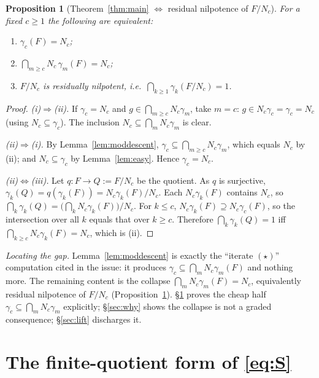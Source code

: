 \documentclass{amsart}
\newtheorem{proposition}{Proposition}
\theoremstyle{definition}
\theoremstyle{remark}
\begin{document}
\begin{proposition}[Theorem~\ref{thm:main} $\Leftrightarrow$ residual nilpotence of $F/N_c$]
\label{prop:equivresnilp}
For a fixed $c\ge1$ the following are equivalent:
\begin{enumerate}
\item[\textup{(i)}] $\gamma_c(F)=N_c$;
\item[\textup{(ii)}] $\bigcap_{m\ge c}N_c\,\gamma_m(F)=N_c$;
\item[\textup{(iii)}] $F/N_c$ is residually nilpotent, i.e.\ $\bigcap_{k\ge1}\gamma_k(F/N_c)=1$.
\end{enumerate}
\end{proposition}
\begin{proof}
\emph{(i)$\Rightarrow$(ii).} If $\gamma_c=N_c$ and $g\in\bigcap_{m\ge c}N_c\gamma_m$,
take $m=c$: $g\in N_c\gamma_c=\gamma_c=N_c$ (using $N_c\subseteq\gamma_c$). The
inclusion $N_c\subseteq\bigcap_m N_c\gamma_m$ is clear.

\emph{(ii)$\Rightarrow$(i).} By Lemma~\ref{lem:moddescent}, $\gamma_c\subseteq
\bigcap_{m\ge c}N_c\gamma_m$, which equals $N_c$ by (ii); and $N_c\subseteq\gamma_c$
by Lemma~\ref{lem:easy}. Hence $\gamma_c=N_c$.

\emph{(ii)$\Leftrightarrow$(iii).} Let $q\colon F\to Q:=F/N_c$ be the quotient. As
$q$ is surjective, $\gamma_k(Q)=q(\gamma_k(F))=N_c\gamma_k(F)/N_c$. Each
$N_c\gamma_k(F)$ contains $N_c$, so
$\bigcap_k\gamma_k(Q)=\big(\bigcap_k N_c\gamma_k(F)\big)/N_c$. For $k\le c$,
$N_c\gamma_k(F)\supseteq N_c\gamma_c(F)$, so the intersection over all $k$ equals that
over $k\ge c$. Therefore $\bigcap_k\gamma_k(Q)=1$ iff $\bigcap_{k\ge c}N_c\gamma_k(F)
=N_c$, which is (ii).
\end{proof}

\noindent\emph{Locating the gap.} Lemma~\ref{lem:moddescent} is exactly the
``iterate $(\star)$'' computation cited in the issue: it produces
$\gamma_c\subseteq\bigcap_m N_c\gamma_m(F)$ and nothing more. The remaining content
is the collapse $\bigcap_m N_c\gamma_m(F)=N_c$, equivalently residual nilpotence of
$F/N_c$ (Proposition~\ref{prop:equivresnilp}). \S\ref{sec:finite} proves the cheap
half $\gamma_c\subseteq\bigcap_m N_c\gamma_m$ explicitly; \S\ref{sec:why} shows the
collapse is not a graded consequence; \S\ref{sec:lift} discharges it.

\section{The finite-quotient form of \eqref{eq:S}}\label{sec:finite}
\end{document}
